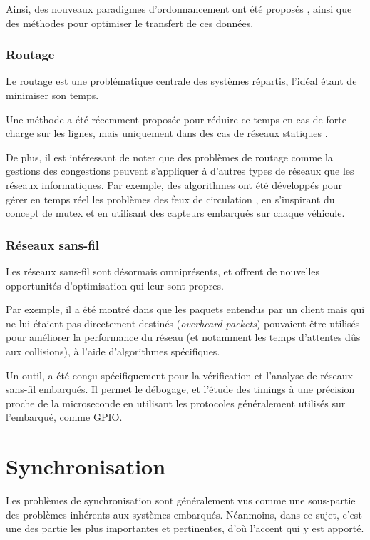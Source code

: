 Ainsi, des nouveaux paradigmes d'ordonnancement ont été proposés \cite{yildirim2012data, kosar2009paradigm}, ainsi que des méthodes pour optimiser le transfert de ces données.

\subsubsection{Routage}
Le routage est une problématique centrale des systèmes répartis, l'idéal étant de minimiser son temps.

Une méthode a été récemment proposée pour réduire ce temps en cas de forte charge sur les lignes, mais uniquement dans des cas de réseaux statiques \cite{jeon2014fully}.


De plus, il est intéressant de noter que des problèmes de routage comme la gestions des congestions peuvent s'appliquer à d'autres types de réseaux que les réseaux informatiques. Par exemple, des algorithmes ont été développés pour gérer en temps réel les problèmes des feux de circulation \cite{aoxue2014distributed}, en s'inspirant du concept de \gls{mutex} et en utilisant des capteurs embarqués sur chaque véhicule.

\subsubsection{Réseaux sans-fil}
Les réseaux sans-fil sont désormais omniprésents, et offrent de nouvelles opportunités d'optimisation qui leur sont propres.

Par exemple, il a été montré dans \cite{hosseinabadi2014exploiting} que les paquets entendus par un client mais qui ne lui étaient pas directement destinés (\textit{overheard packets}) pouvaient être utilisés pour améliorer la performance du réseau (et notamment les temps d'attentes dûs aux collisions), à l'aide d'algorithmes spécifiques.

Un outil,  \cite{lim2013flocklab} a été conçu spécifiquement pour la vérification et l'analyse de réseaux sans-fil embarqués. Il permet le débogage, et l'étude des timings à une précision proche de la microseconde en utilisant les protocoles généralement utilisés sur l'embarqué, comme \ac{GPIO}.  

\section{Synchronisation}
Les problèmes de synchronisation sont généralement vus comme une sous-partie des problèmes inhérents aux systèmes embarqués. Néanmoins, dans ce sujet, c'est une des partie les plus importantes et pertinentes, d'où l'accent qui y est apporté.

